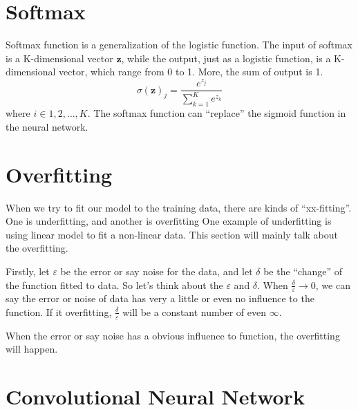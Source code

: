 \documentclass{article}
\begin{document}
\section{Softmax}
\label{sec:softmax}

Softmax function is a generalization of the logistic function.
The input of softmax is a K-dimensional vector $\mathbf{z}$,
while the output, just as a logistic function, is a K-dimensional vector,
which range from 0 to 1. More, the sum of output is 1.
\begin{equation}
\sigma(\mathbf{z})_j = \frac{e^{z_j}}{\sum_{k=1}^{K}e^{z_k}}
\end{equation}
where $i \in 1,2,\dots,K$.
The softmax function can ``replace'' the sigmoid function in the neural network.


\section{Overfitting}
\label{sec:of}

When we try to fit our model to the training data, there are kinds of ``xx-fitting''. One is underfitting, and another is overfitting
One example of underfitting  is using linear model to fit a non-linear data.
This section will mainly talk about the overfitting. 

Firstly, let $\varepsilon$ be the error or say noise for the data, and let $\delta$ be the ``change'' of the function fitted to data.
So let's think about the $\varepsilon$ and $\delta$. When $\frac{\delta}{\varepsilon} \rightarrow 0$, we can say the error or noise of data has
very a little or even no influence to the function. If it overfitting, $\frac{\delta}{\varepsilon}$ will be a constant number of even $\infty$.

When the error or say noise has a obvious influence to function, the overfitting will happen.


\section{Convolutional Neural Network}
\label{sec:cnn}
\end{document}
